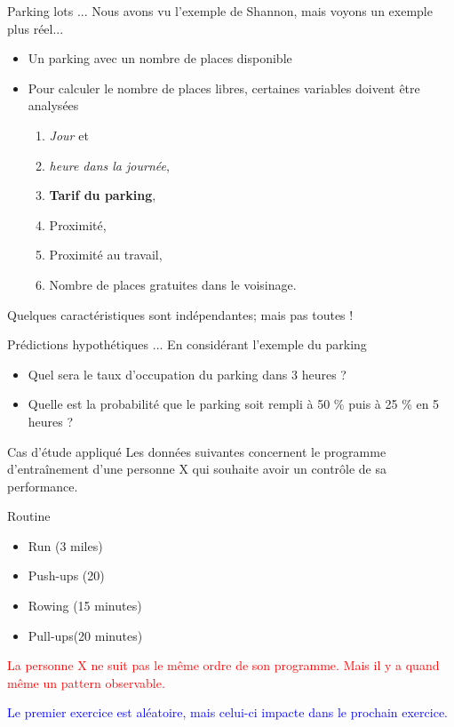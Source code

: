 \documentclass[aspectratio=169,xcolor=dvipsnames, t]{beamer}
\begin{document}
\begin{frame}{Parking lots ...}
	Nous avons vu l'exemple de Shannon, mais voyons un exemple plus réel...
	\begin{itemize}
		\item Un parking avec un nombre de places disponible
		\item Pour calculer le nombre de places libres, certaines variables doivent être analysées
		\begin{enumerate}
			\item \textit{Jour} et 
			\item \textit{heure dans la journée},
			\item \textbf{Tarif du parking},
			\item Proximité,
			\item Proximité au travail,
			\item Nombre de places gratuites dans le voisinage.
		\end{enumerate}
	\end{itemize}
	
	Quelques caractéristiques sont indépendantes; mais pas toutes !
	
\end{frame}

\begin{frame}{Prédictions hypothétiques ... }
	En considérant l'exemple du parking
	\begin{itemize}
		\item Quel sera le taux d'occupation du parking dans 3 heures ?
		\item Quelle est la probabilité que le parking soit rempli à 50 \% puis à 25 \% en 5 heures ?
	\end{itemize}
	
\end{frame}

\begin{frame}{Cas d'étude appliqué}
	Les données suivantes concernent le programme d'entraînement d'une personne X qui souhaite avoir un contrôle de sa performance.
	
	\begin{block}{Routine}
		\begin{itemize}
			\item Run (3 miles)
			\item Push-ups (20)
			\item Rowing (15 minutes)
			\item Pull-ups(20 minutes)
		\end{itemize}
	\end{block}

	\textcolor{red}{La personne X ne suit pas le même ordre de son programme. Mais il y a quand même un pattern observable.}
	
	\textcolor{blue}{Le premier exercice est aléatoire, mais celui-ci impacte dans le prochain exercice.}
	
\end{frame}
\end{document}
